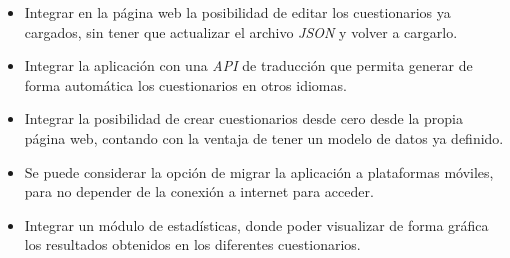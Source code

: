\begin{itemize}
	\item Integrar en la página web la posibilidad de editar los cuestionarios ya cargados, sin tener que actualizar el archivo \textit{JSON} y volver a cargarlo.
	\item Integrar la aplicación con una \textit{API} de traducción que permita generar de forma automática los cuestionarios en otros idiomas.
	\item Integrar la posibilidad de crear cuestionarios desde cero desde la propia página web, contando con la ventaja de tener un modelo de datos ya definido.
	\item Se puede considerar la opción de migrar la aplicación a plataformas móviles, para no depender de la conexión a internet para acceder.
	\item Integrar un módulo de estadísticas, donde poder visualizar de forma gráfica los resultados obtenidos en los diferentes cuestionarios.
\end{itemize}


